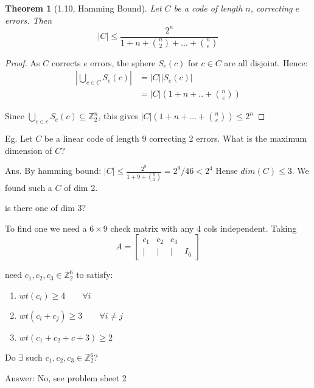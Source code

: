 \documentclass[amsfonts]{amsart}
\newtheorem{thm}{Theorem}[section]
\theoremstyle{definition}
\theoremstyle{remark}
\numberwithin{equation}{section}
\begin{document}
\begin{thm}[1.10, Hamming Bound]
	Let $C$ be a code of length $n$, correcting $e$ errors. \newline
	Then \[ |C| \leq \frac{2^n}{1 + n + {n \choose 2} + ... + {n \choose e}}\]
\end{thm}

\begin{proof}
	As $C$ corrects $e$ errors, the sphere $S_e(c)$ for $c \in C$ are all disjoint. Hence: \newline
	\begin{align*}
		| \bigcup_{c\in C} S_e(c)| &= |C| | S_e(c)| \\
									&= |C| (1 + n + .. + {n \choose e}) 
	\end{align*}

	Since $\bigcup_{c \in c} S_e(c) \subseteq \mathbb{Z}_2^n$, this gives \newline
	$|C| (1 + n + ... + {n \choose e}) \leq 2^n$
\end{proof}

Eg. Let $C$ be a linear code of length 9 correcting 2 errors. What is the maximum dimension of $C$?

Ans. By hamming bound: \newline
	$|C| \leq \frac{2^9}{1+9+{9 \choose 2}}= 2^9/46 < 2^4$
	Hense $dim(C) \leq 3$.
	We found such a $C$ of dim 2.

	is there one of dim 3?

	To find one we need a $6 \times 9$ check matrix with any 4 cols independent. \newline
	Taking \[
		A = \begin{bmatrix}
			c_1 & c_2 & c_3 \\
			| & | & | & I_6

		\end{bmatrix}
	\]

	need $c_1, c_2, c_3 \in \mathbb{Z}_2^6$ to satisfy: \newline

	\begin{enumerate}
		\item $wt(c_i)\geq 4 \qquad \forall i$
		\item $wt(c_i + c_j) \geq 3 \qquad \forall i\neq j$
		\item $wt(c_1 + c_2 + c+3) \geq 2$
	\end{enumerate}

	Do $\exists$ such $c_1, c_2, c_3 \in \mathbb{Z}_2^6$?

	Answer: No, see problem sheet 2
\end{document}
